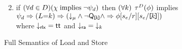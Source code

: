 \begin{figure*}
\begin{center}
\begin{minipage}{1.0\textwidth}
\begin{enumerate}
\begin{math}
{      }      
    \end{math}
  \item if 
    \begin{math}
      (\forall\bEv\in\bEvs)(\cForm \textimplies
      \lnot\bForm_\bEv)
    \end{math}
    then
    \begin{math}
      (\forall\dVal)
    \end{math}
    $\aTr[\bEvs](\aForm)$ implies 
    \begin{math}
      \bForm_\bEv
      \limplies (\cExp{=}\dVal)
      \limplies \PBR{        
        \Dmode{\amode}
        \land \lnot\QxREF{\dVal}
        \land
        \limplies \aForm[\bReg_\aEv/\aReg][\bReg_\aEv/\REF{\dVal}]
      }      
    \end{math}
    \\ where $\Dmode{\mRLX}=\TRUE$ and $\Dmode{\mRA}=\Dx{\dVal}$
  \end{enumerate}  
  \end{minipage}
  \end{center}
  \caption{Full Semantics of Load and Store}
  \label{fig:full}
\end{figure*}